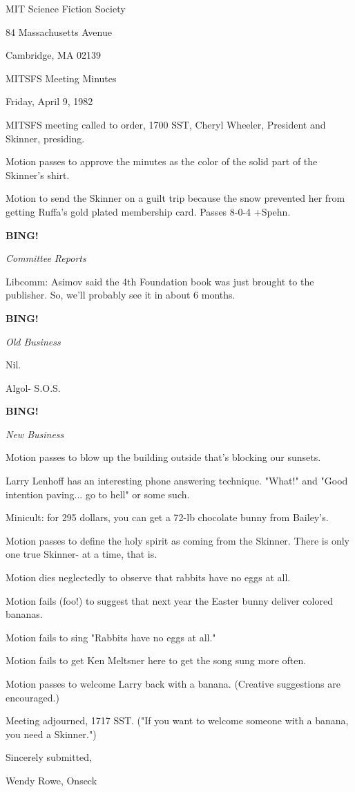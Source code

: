 \documentclass[12pt]{article}
\newcommand{\bing}{{\bf BING!} }
\newcommand{\goto}[1]{\bing \vskip 12pt \centerline{{\em{#1}}}}
\begin{document}
\begin{center}

MIT Science Fiction Society 

84 Massachusetts Avenue

Cambridge, MA 02139

\vspace{12pt}

MITSFS Meeting Minutes 

Friday, April 9, 1982

\end{center}
 
\vspace{18pt}

\setlength{\parskip}{6pt}

\noindent
MITSFS meeting called to order, 1700 SST,
Cheryl Wheeler, President and Skinner, presiding.

Motion passes to approve the minutes as the color of the solid part of the Skinner's shirt.

Motion to send the Skinner on a guilt trip because the snow prevented her from getting Ruffa's gold plated membership card. Passes 8-0-4 +Spehn.

\goto{Committee Reports}

Libcomm: Asimov said the 4th Foundation book was just brought to the publisher. So, we'll probably see it in about 6 months.

\goto{Old Business}

Nil.

Algol- S.O.S.

\goto{New Business}

Motion passes to blow up the building outside that's blocking our sunsets.

Larry Lenhoff has an interesting phone answering technique. "What!" and "Good intention paving... go to hell" or some such.

Minicult: for 295 dollars, you can get a 72-lb chocolate bunny from Bailey's.

Motion passes to define the holy spirit as coming from the Skinner. There is only one true Skinner- at a time, that is.

Motion dies neglectedly to observe that rabbits have no eggs at all.

Motion fails (foo!) to suggest that next year the Easter bunny deliver colored bananas.

Motion fails to sing "Rabbits have no eggs at all."

Motion fails to get Ken Meltsner here to get the song sung more often.

Motion passes to welcome Larry back with a banana. (Creative suggestions are encouraged.)

\vspace{12pt}

\noindent
Meeting adjourned, 1717 SST. ("If you want to welcome someone with a banana, you need a Skinner.")

\vspace{18pt}

\centerline{Sincerely submitted,}
\centerline{Wendy Rowe, Onseck}
\end{document}

